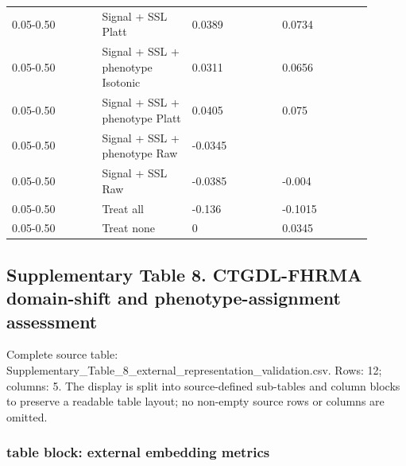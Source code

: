 \documentclass[utf8]{frontiers_suppmat}
\begin{document}
\begin{landscape}
\begin{longtable}{L{0.225\linewidth} L{0.225\linewidth} L{0.225\linewidth} L{0.225\linewidth}}
0.\allowbreak{}05-\allowbreak{}0.\allowbreak{}50 & Signal + SSL Platt & 0.\allowbreak{}0389 & 0.\allowbreak{}0734 \\
0.\allowbreak{}05-\allowbreak{}0.\allowbreak{}50 & Signal + SSL + phenotype Isotonic & 0.\allowbreak{}0311 & 0.\allowbreak{}0656 \\
0.\allowbreak{}05-\allowbreak{}0.\allowbreak{}50 & Signal + SSL + phenotype Platt & 0.\allowbreak{}0405 & 0.\allowbreak{}075 \\
0.\allowbreak{}05-\allowbreak{}0.\allowbreak{}50 & Signal + SSL + phenotype Raw & -\allowbreak{}0.\allowbreak{}0345 &  \\
0.\allowbreak{}05-\allowbreak{}0.\allowbreak{}50 & Signal + SSL Raw & -\allowbreak{}0.\allowbreak{}0385 & -\allowbreak{}0.\allowbreak{}004 \\
0.\allowbreak{}05-\allowbreak{}0.\allowbreak{}50 & Treat all & -\allowbreak{}0.\allowbreak{}136 & -\allowbreak{}0.\allowbreak{}1015 \\
0.\allowbreak{}05-\allowbreak{}0.\allowbreak{}50 & Treat none & 0 & 0.\allowbreak{}0345 \\
\end{longtable}
\normalsize
\end{landscape}


\clearpage

\subsection*{Supplementary Table 8. CTGDL-FHRMA domain-shift and phenotype-assignment assessment}

Complete source table: Supplementary\_\allowbreak{}Table\_\allowbreak{}8\_\allowbreak{}external\_\allowbreak{}representation\_\allowbreak{}validation.\allowbreak{}csv. Rows: 12; columns: 5. The display is split into source-defined sub-tables and column blocks to preserve a readable table layout; no non-empty source rows or columns are omitted.

\subsubsection*{table block: external embedding metrics}
\end{document}
